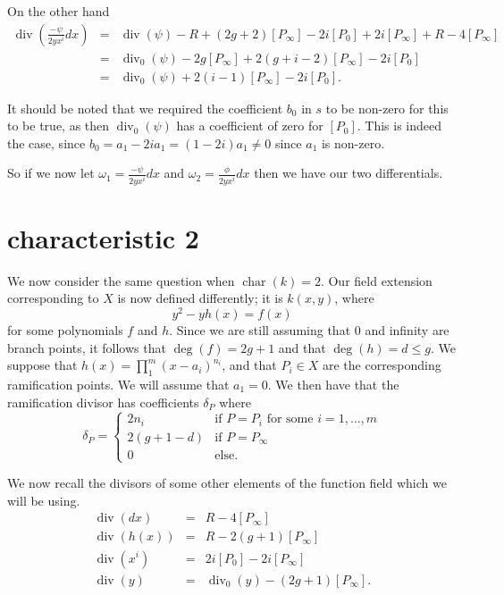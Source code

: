 \documentclass[draft, 11pt]{article} %
\theoremstyle{plain}
\theoremstyle{remark}
\DeclareMathOperator{\di}{div}
\DeclareMathOperator{\cha}{char}
\begin{document}
On the other hand
\begin{eqnarray*}
\di \left( \frac{-\psi}{2yx^i}dx\right) & = & \di (\psi ) -R + (2g+2)[P_\infty] - 2i[P_0] + 2i[P_\infty] + R -4[P_\infty] \\
& = & \di_0(\psi) - 2g[P_\infty] + 2(g+i-2)[P_\infty] -2i[P_0] \\
& = & \di_0(\psi) + 2(i-1)[P_\infty] - 2i[P_0].
\end{eqnarray*}

It should be noted that we required the coefficient $b_0$ in $s$ to be non-zero for this to be true, as then $\di_0(\psi)$ has a coefficient of zero for $[P_0]$. This is indeed the case, since $b_0 = a_1 - 2ia_1 = (1-2i)a_1 \neq 0$ since $a_1$ is non-zero. 


So if we now let $\omega_1 = \frac{-\psi}{2yx^i}dx$ and $\omega_2 = \frac{\phi}{2yx^i}dx$ then we have our two differentials.

\newpage

\section{characteristic 2}

We now consider the same question when $\cha (k) = 2$.
Our field extension corresponding to $X$ is now defined differently; it is $k(x,y)$, where
\[
y^2 - yh(x) = f(x)
\]
for some polynomials $f$ and $h$.
Since we are still assuming that $0$ and infinity are branch points, it follows that $\deg(f) = 2g+1$ and that $\deg(h)  = d  \leq g$. 
We suppose that $h(x) = \prod_1^m (x-a_i)^{n_i}$, and that $P_i\in X$ are the corresponding ramification points.
We will assume that $a_1 = 0$.
We then have that the ramification divisor has coefficients $\delta_P$ where
\[
\delta_P = \left \{ \begin{array}{ll}
2n_i & \text{if } P= P_i \text{ for some } i=1, \ldots , m \\
2(g+1-d) & \text{if } P=P_\infty \\
0 & \text{else.}
\end{array}
\right.
\]


We now recall the divisors of some other elements of the function field which we will be using.
\begin{eqnarray*}
\di (dx) & = & R - 4[P_\infty] \\
\di (h(x)) & = & R - 2(g+1)[P_\infty] \\
\di (x^i) & = & 2i[P_0] - 2i[P_\infty]\\
\di (y) & = & \di_0(y) - (2g+1)[P_\infty].
\end{eqnarray*}
\end{document}

